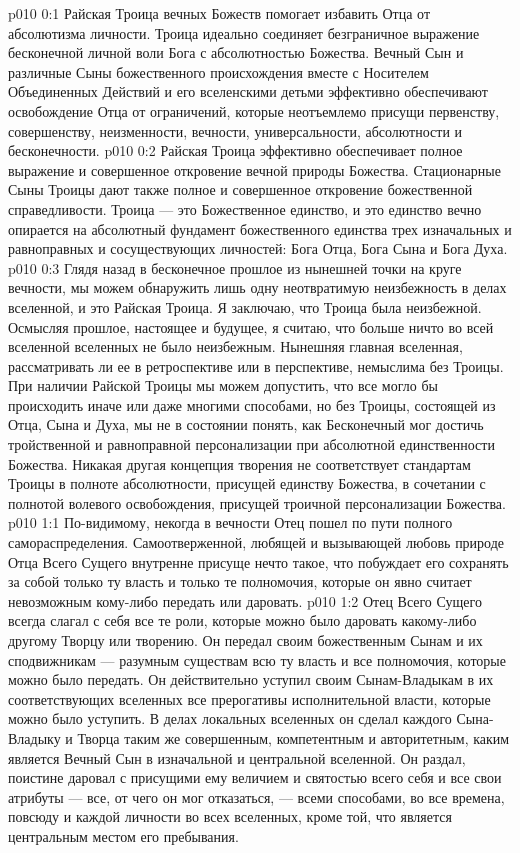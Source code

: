 \author{Вселенский Цензор}
\vs p010 0:1 Райская Троица вечных Божеств помогает избавить Отца от абсолютизма личности. Троица идеально соединяет безграничное выражение бесконечной личной воли Бога с абсолютностью Божества. Вечный Сын и различные Сыны божественного происхождения вместе с Носителем Объединенных Действий и его вселенскими детьми эффективно обеспечивают освобождение Отца от ограничений, которые неотъемлемо присущи первенству, совершенству, неизменности, вечности, универсальности, абсолютности и бесконечности.
\vs p010 0:2 Райская Троица эффективно обеспечивает полное выражение и совершенное откровение вечной природы Божества. Стационарные Сыны Троицы дают также полное и совершенное откровение божественной справедливости. Троица --- это Божественное единство, и это единство вечно опирается на абсолютный фундамент божественного единства трех изначальных и равноправных и сосуществующих личностей: Бога Отца, Бога Сына и Бога Духа.
\vs p010 0:3 \pc Глядя назад в бесконечное прошлое из нынешней точки на круге вечности, мы можем обнаружить лишь одну неотвратимую неизбежность в делах вселенной, и это Райская Троица. Я заключаю, что Троица была неизбежной. Осмысляя прошлое, настоящее и будущее, я считаю, что больше ничто во всей вселенной вселенных не было неизбежным. Нынешняя главная вселенная, рассматривать ли ее в ретроспективе или в перспективе, немыслима без Троицы. При наличии Райской Троицы мы можем допустить, что все могло бы происходить иначе или даже многими способами, но без Троицы, состоящей из Отца, Сына и Духа, мы не в состоянии понять, как Бесконечный мог достичь тройственной и равноправной персонализации при абсолютной единственности Божества. Никакая другая концепция творения не соответствует стандартам Троицы в полноте абсолютности, присущей единству Божества, в сочетании с полнотой волевого освобождения, присущей троичной персонализации Божества.
\vs p010 1:1 По\hyp{}видимому, некогда в вечности Отец пошел по пути полного самораспределения. Самоотверженной, любящей и вызывающей любовь природе Отца Всего Сущего внутренне присуще нечто такое, что побуждает его сохранять за собой только ту власть и только те полномочия, которые он явно считает невозможным кому\hyp{}либо передать или даровать.
\vs p010 1:2 Отец Всего Сущего всегда слагал с себя все те роли, которые можно было даровать какому\hyp{}либо другому Творцу или творению. Он передал своим божественным Сынам и их сподвижникам --- разумным существам всю ту власть и все полномочия, которые можно было передать. Он действительно уступил своим Сынам\hyp{}Владыкам в их соответствующих вселенных все прерогативы исполнительной власти, которые можно было уступить. В делах локальных вселенных он сделал каждого Сына\hyp{}Владыку и Творца таким же совершенным, компетентным и авторитетным, каким является Вечный Сын в изначальной и центральной вселенной. Он раздал, поистине даровал с присущими ему величием и святостью всего себя и все свои атрибуты --- все, от чего он мог отказаться, --- всеми способами, во все времена, повсюду и каждой личности во всех вселенных, кроме той, что является центральным местом его пребывания.
